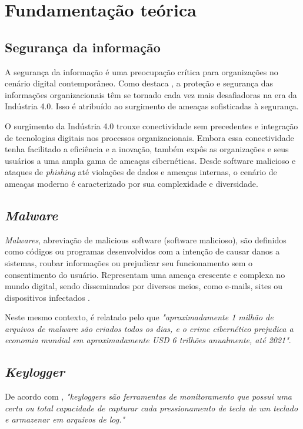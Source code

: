 \documentclass[12pt]{article}
\begin{document}
\section{Fundamentação teórica}

\subsection{Segurança da informação}
A segurança da informação é uma preocupação crítica para organizações no cenário digital contemporâneo. Como destaca \citep{bhaharin2019issues} , a proteção e segurança das informações organizacionais têm se tornado cada vez mais desafiadoras na era da Indústria 4.0. Isso é atribuído ao surgimento de ameaças sofisticadas à segurança.

O surgimento da Indústria 4.0 trouxe conectividade sem precedentes e integração de tecnologias digitais nos processos organizacionais. Embora essa conectividade tenha facilitado a eficiência e a inovação, também expôs as organizações e seus usuários a uma ampla gama de ameaças cibernéticas. Desde software malicioso e ataques de \textit{phishing} até violações de dados e ameaças internas, o cenário de ameaças moderno é caracterizado por sua complexidade e diversidade.
\subsection{\textit{Malware}}
\textit{Malwares}, abreviação de malicious software (software malicioso), são definidos como códigos ou programas desenvolvidos com a intenção de causar danos a sistemas, roubar informações ou prejudicar seu funcionamento sem o consentimento do usuário. Representam uma ameaça crescente e complexa no mundo digital, sendo disseminados por diversos meios, como e-mails, sites ou dispositivos infectados \citep{singh2021keylogger}.

Neste mesmo contexto, é relatado pelo \citep{singh2018infringement} que \textit{"aproximadamente 1 milhão de arquivos de \textit{malware} são criados todos os dias, e o crime cibernético prejudica a economia mundial em aproximadamente USD 6 trilhões anualmente, até 2021"}.
\subsection{\textit{Keylogger}}
De acordo com \citep{wajahat2019novel}, \textit{"\textit{keyloggers} são ferramentas de monitoramento que possui uma certa ou total capacidade de capturar cada pressionamento de tecla de um teclado e armazenar em arquivos de log."}
\end{document}
